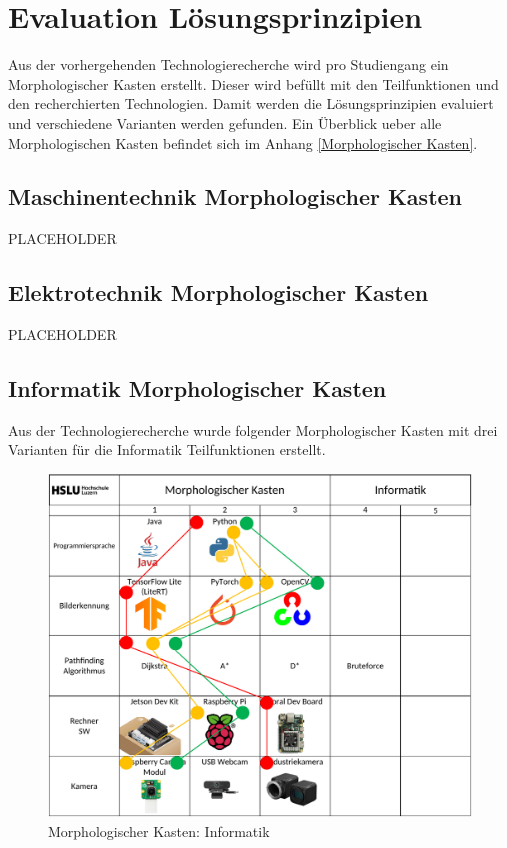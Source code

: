 \section{Evaluation Lösungsprinzipien}

Aus der vorhergehenden Technologierecherche wird pro Studiengang ein Morphologischer Kasten erstellt. Dieser wird befüllt mit den Teilfunktionen und den recherchierten Technologien. Damit werden die Lösungsprinzipien evaluiert und verschiedene Varianten werden gefunden. Ein Überblick ueber alle Morphologischen Kasten befindet sich im Anhang \ref{Morphologischer Kasten}.

\subsection{Maschinentechnik Morphologischer Kasten}

PLACEHOLDER

\subsection{Elektrotechnik Morphologischer Kasten}

PLACEHOLDER

\subsection{Informatik Morphologischer Kasten}

Aus der Technologierecherche wurde folgender Morphologischer Kasten mit drei Varianten für die Informatik Teilfunktionen erstellt.

\begin{figure}[H]
\centering
\includegraphics[width=\textwidth]{assets/MK_Informatik.pdf}
\caption{Morphologischer Kasten: Informatik}
\label{fig:mk-informatik}
\end{figure}


